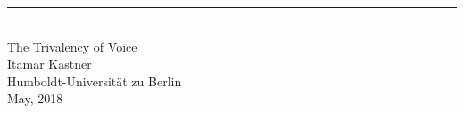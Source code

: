 \singlespacing
\begin{center}
\rule{165pt}{0pt} \\
\vspace{1cm}
\LARGE{The Trivalency of Voice}\\
\vspace{2cm}
\large{Itamar Kastner} \\
\vspace{2cm}
\normalsize{Humboldt-Universit\"at zu Berlin} \\
\vspace{0.4cm}
\normalsize{May, 2018} \\
\end{center}